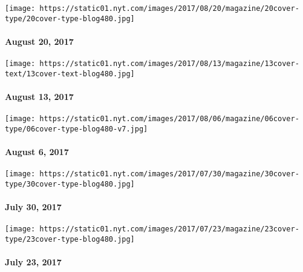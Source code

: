 \href{https://www.nytimes.com/issue/magazine/2017/08/18/82017-issue}{}

\texttt{[image: https://static01.nyt.com/images/2017/08/20/magazine/20cover-type/20cover-type-blog480.jpg]}

\hypertarget{august-20-2017}{%
\paragraph{August 20, 2017}\label{august-20-2017}}

\href{https://www.nytimes.com/issue/magazine/2017/08/10/the-81317-issue}{}

\texttt{[image: https://static01.nyt.com/images/2017/08/13/magazine/13cover-text/13cover-text-blog480.jpg]}

\hypertarget{august-13-2017}{%
\paragraph{August 13, 2017}\label{august-13-2017}}

\href{https://www.nytimes.com/issue/magazine/2017/08/04/magazine-index}{}

\texttt{[image: https://static01.nyt.com/images/2017/08/06/magazine/06cover-type/06cover-type-blog480-v7.jpg]}

\hypertarget{august-6-2017}{%
\paragraph{August 6, 2017}\label{august-6-2017}}

\href{https://www.nytimes.com/issue/magazine/2017/07/28/magazine-index}{}

\texttt{[image: https://static01.nyt.com/images/2017/07/30/magazine/30cover-type/30cover-type-blog480.jpg]}

\hypertarget{july-30-2017}{%
\paragraph{July 30, 2017}\label{july-30-2017}}

\href{https://www.nytimes.com/issue/magazine/2017/07/21/magazine-index-20170723}{}

\texttt{[image: https://static01.nyt.com/images/2017/07/23/magazine/23cover-type/23cover-type-blog480.jpg]}

\hypertarget{july-23-2017}{%
\paragraph{July 23, 2017}\label{july-23-2017}}

